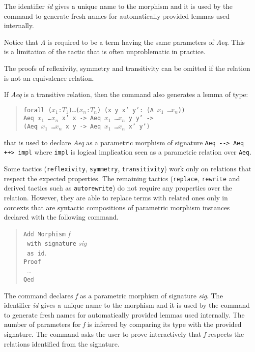 The identifier \textit{id} gives a unique name to the morphism and it is
used by the command to generate fresh names for automatically provided lemmas
used internally.

Notice that \textit{A} is required to be a term having the same parameters
of \textit{Aeq}. This is a limitation of the tactic that is often unproblematic
in practice.

The proofs of reflexivity, symmetry and transitivity can be omitted if the
relation is not an equivalence relation.

If \textit{Aeq} is a transitive relation, then the command also generates
a lemma of type:
\begin{quote}
\texttt{forall ($x_1$:$T_1$)\ldots($x_n$:$T_n$)
 (x y x' y': (A $x_1$ \ldots $x_n$))\\
  Aeq $x_1$ \ldots $x_n$ x' x -> Aeq $x_1$ \ldots $x_n$ y y' ->\\
  (Aeq $x_1$ \ldots $x_n$ x y -> Aeq $x_1$ \ldots $x_n$ x' y')}
\end{quote}
that is used to declare \textit{Aeq} as a parametric morphism of signature
\texttt{Aeq -{}-> Aeq ++> impl} where \texttt{impl} is logical implication
seen as a parametric relation over \texttt{Aeq}.

Some tactics
(\texttt{reflexivity}, \texttt{symmetry}, \texttt{transitivity}) work only
on relations that respect the expected properties. The remaining tactics
(\texttt{replace}, \texttt{rewrite} and derived tactics such as
\texttt{autorewrite}) do not require any properties over the relation.
However, they are able to replace terms with related ones only in contexts
that are syntactic compositions of parametric morphism instances declared with
the following command.

\begin{verse}
  \texttt{Add Morphism} \textit{f}\\
  \texttt{~with signature} \textit{sig}\\
  \texttt{~as id}.\\
  \texttt{Proof}\\
  ~\ldots\\
  \texttt{Qed}
\end{verse}

The command declares \textit{f} as a parametric morphism of signature
\textit{sig}. The identifier \textit{id} gives a unique name to the morphism
and it is used by the command to generate fresh names for automatically
provided lemmas used internally. The number of parameters for \textit{f}
is inferred by comparing its type with the provided signature.
The command asks the user to prove interactively that \textit{f} respects
the relations identified from the signature.

